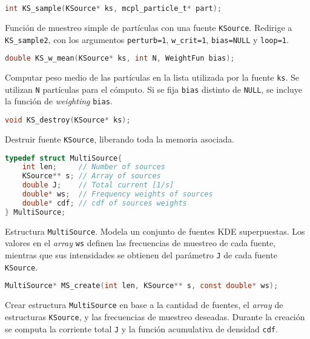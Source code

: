 \begin{footnotesize}
\begin{lstlisting}[language=C]
int KS_sample(KSource* ks, mcpl_particle_t* part);
\end{lstlisting}
\begin{addmargin}[0.5cm]{0cm}
Función de muestreo simple de partículas con una fuente \verb|KSource|. Redirige a \verb|KS_sample2|, con los argumentos \verb|perturb=1|, \verb|w_crit=1|, \verb|bias=NULL| y \verb|loop=1|.
\end{addmargin}

\begin{lstlisting}[language=C]
double KS_w_mean(KSource* ks, int N, WeightFun bias);
\end{lstlisting}
\begin{addmargin}[0.5cm]{0cm}
Computar peso medio de las partículas en la lista utilizada por la fuente \verb|ks|. Se utilizan \verb|N| partículas para el cómputo. Si se fija \verb|bias| distinto de \verb|NULL|, se incluye la función de \emph{weighting} \verb|bias|.
\end{addmargin}

\begin{lstlisting}[language=C]
void KS_destroy(KSource* ks);
\end{lstlisting}
\begin{addmargin}[0.5cm]{0cm}
Destruir fuente \verb|KSource|, liberando toda la memoria asociada.
\end{addmargin}

\begin{lstlisting}[language=C]
typedef struct MultiSource{
	int len;     // Number of sources
	KSource** s; // Array of sources
	double J;    // Total current [1/s]
	double* ws;  // Frequency weights of sources
	double* cdf; // cdf of sources weights
} MultiSource;
\end{lstlisting}
\begin{addmargin}[0.5cm]{0cm}
Estructura \verb|MultiSource|. Modela un conjunto de fuentes KDE superpuestas. Los valores en el \emph{array} \verb|ws| definen las frecuencias de muestreo de cada fuente, mientras que sus intensidades se obtienen del parámetro \verb|J| de cada fuente \verb|KSource|.
\end{addmargin}

\begin{lstlisting}[language=C]
MultiSource* MS_create(int len, KSource** s, const double* ws);
\end{lstlisting}
\begin{addmargin}[0.5cm]{0cm}
Crear estructura \verb|MultiSource| en base a la cantidad de fuentes, el \emph{array} de estructuras \verb|KSource|, y las frecuencias de muestreo deseadas. Durante la creación se computa la corriente total \verb|J| y la función acumulativa de densidad \verb|cdf|.
\end{addmargin}


\end{footnotesize}
